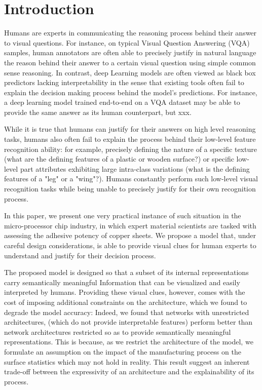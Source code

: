 \documentclass[10pt,twocolumn,letterpaper]{article}
\begin{document}
\section{Introduction}

Humans are experts in communicating the reasoning process behind their answer to visual questions.
For instance, on typical Visual Question Answering (VQA) samples, 
human annotators are often able to precisely justify in natural language the reason 
behind their answer to a certain visual question using simple common sense reasoning.
In contrast, deep Learning models are often viewed as black box predictors lacking interpretability 
in the sense that existing tools often fail to explain the decision making process behind the model’s predictions.
For instance, a deep learning model trained end-to-end on a VQA dataset may be able to provide the same answer as its
human counterpart, but xxx.

While it is true that humans can justify for their answers on high level reasoning tasks, 
humans also often fail to explain the process behind their low-level feature recognition ability:
for example, precisely defining the nature of a specific texture (what are the defining features of a plastic or wooden surface?) or specific low-level part attributes exhibiting large intra-class variations (what is the defining features of a "leg" or a "wing"?).
Humans constantly perform such low-level visual recognition tasks while being unable to precisely justify for their own recognition process.

In this paper, we present one very practical instance of such situation in the micro-processor chip industry, 
in which expert material scientists are tasked with assessing the adhesive potency of copper sheets.
We propose a model that, under careful design considerations, is able to provide visual clues 
for human experts to understand and justify for their decision process.

The proposed model is designed so that a subset of its internal representations carry semantically meaningful 
Information that can be visualized and easily interpreted by humans.
Providing these visual clues, however, comes with the cost of imposing additional constraints on the architecture,
which we found to degrade the model accuracy:
Indeed, we found that networks with unrestricted architectures, 
(which do not provide interpretable features)
perform better than network architectures restricted so as to provide 
semantically meaningful representations.
This is because, as we restrict the architecture of the model, 
we formulate an assumption on the impact of the manufacturing process 
on the surface statistics which may not hold in reality.
This result suggest an inherent trade-off between the 
expressivity of an architecture and the explainability of its process.
\end{document}
